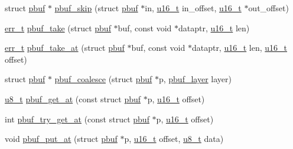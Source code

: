 \begin{DoxyCompactItemize}
\item 
struct \hyperlink{structpbuf}{pbuf} $\ast$ \hyperlink{group__pbuf_gabe4dfb2409c87a7c52c9a22a779f92e9}{pbuf\+\_\+skip} (struct \hyperlink{structpbuf}{pbuf} $\ast$in, \hyperlink{group__compiler__abstraction_ga77570ac4fcab86864fa1916e55676da2}{u16\+\_\+t} in\+\_\+offset, \hyperlink{group__compiler__abstraction_ga77570ac4fcab86864fa1916e55676da2}{u16\+\_\+t} $\ast$out\+\_\+offset)
\item 
\hyperlink{group__infrastructure__errors_gaf02d9da80fd66b4f986d2c53d7231ddb}{err\+\_\+t} \hyperlink{group__pbuf_gad1e31e370271335b197272af2724ca85}{pbuf\+\_\+take} (struct \hyperlink{structpbuf}{pbuf} $\ast$buf, const void $\ast$dataptr, \hyperlink{group__compiler__abstraction_ga77570ac4fcab86864fa1916e55676da2}{u16\+\_\+t} len)
\item 
\hyperlink{group__infrastructure__errors_gaf02d9da80fd66b4f986d2c53d7231ddb}{err\+\_\+t} \hyperlink{group__pbuf_gae1cf2bf7454ff87ff377b0b2262f9b44}{pbuf\+\_\+take\+\_\+at} (struct \hyperlink{structpbuf}{pbuf} $\ast$buf, const void $\ast$dataptr, \hyperlink{group__compiler__abstraction_ga77570ac4fcab86864fa1916e55676da2}{u16\+\_\+t} len, \hyperlink{group__compiler__abstraction_ga77570ac4fcab86864fa1916e55676da2}{u16\+\_\+t} offset)
\item 
struct \hyperlink{structpbuf}{pbuf} $\ast$ \hyperlink{group__pbuf_ga031469589fa95ece3bf1c136d1509eac}{pbuf\+\_\+coalesce} (struct \hyperlink{structpbuf}{pbuf} $\ast$p, \hyperlink{group__pbuf_gaee1baa59bb2f85ba575b5a8619ac1ebf}{pbuf\+\_\+layer} layer)
\item 
\hyperlink{group__compiler__abstraction_ga4caecabca98b43919dd11be1c0d4cd8e}{u8\+\_\+t} \hyperlink{group__pbuf_ga6d803d9945bffb7ad97743f2fa503da6}{pbuf\+\_\+get\+\_\+at} (const struct \hyperlink{structpbuf}{pbuf} $\ast$p, \hyperlink{group__compiler__abstraction_ga77570ac4fcab86864fa1916e55676da2}{u16\+\_\+t} offset)
\item 
int \hyperlink{group__pbuf_ga839f342803b0cf89049744124c5a98ad}{pbuf\+\_\+try\+\_\+get\+\_\+at} (const struct \hyperlink{structpbuf}{pbuf} $\ast$p, \hyperlink{group__compiler__abstraction_ga77570ac4fcab86864fa1916e55676da2}{u16\+\_\+t} offset)
\item 
void \hyperlink{group__pbuf_gaf76863707dc02993eae116574b1ea03f}{pbuf\+\_\+put\+\_\+at} (struct \hyperlink{structpbuf}{pbuf} $\ast$p, \hyperlink{group__compiler__abstraction_ga77570ac4fcab86864fa1916e55676da2}{u16\+\_\+t} offset, \hyperlink{group__compiler__abstraction_ga4caecabca98b43919dd11be1c0d4cd8e}{u8\+\_\+t} data)

\end{DoxyCompactItemize}

